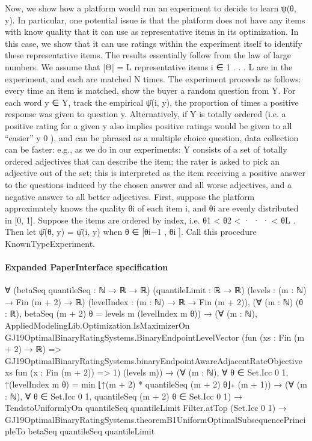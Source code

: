 \documentclass[10pt]{article}
\begin{document}
\begin{ReviewVerbatim}
Now, we show how a platform would run an experiment to decide to learn ψ(θ, y). In particular,
one potential issue is that the platform does not have any items with know quality that it can use
as representative items in its optimization. In this case, we show that it can use ratings within the
experiment itself to identify these representative items. The results essentially follow from the law
of large numbers.
We assume that |Θ| = L representative items i ∈ {1 . . . L} are in the experiment, and each are
matched N times. The experiment proceeds as follows: every time an item is matched, show the
buyer a random question from Y. For each word y ∈ Y, track the empirical ψ̂(i, y), the proportion
of times a positive response was given to question y. Alternatively, if Y is totally ordered (i.e. a
positive rating for a given y also implies positive ratings would be given to all “easier” y 0 ), and
can be phrased as a multiple choice question, data collection can be faster: e.g., as we do in our
experiments: Y consists of a set of totally ordered adjectives that can describe the item; the rater is
asked to pick an adjective out of the set; this is interpreted as the item receiving a positive answer
to the questions induced by the chosen answer and all worse adjectives, and a negative answer to
all better adjectives.
First, suppose the platform approximately knows the quality θi of each item i, and θi are evenly
distributed in [0, 1]. Suppose the items are ordered by index, i.e. θ1 < θ2 < · · · < θL . Then let
ψ̂(θ, y) = ψ̂(i, y) when θ ∈ [θi−1 , θi ]. Call this procedure KnownTypeExperiment.
\end{ReviewVerbatim}



\paragraph{Expanded PaperInterface specification}
\begin{ReviewVerbatim}
∀ (betaSeq quantileSeq : ℕ → ℝ → ℝ) (quantileLimit : ℝ → ℝ) (levels : (m : ℕ) → Fin (m + 2) → ℝ)
  (levelIndex : (m : ℕ) → ℝ → Fin (m + 2)),
  (∀ (m : ℕ) (θ : ℝ), betaSeq (m + 2) θ = levels m (levelIndex m θ)) →
    (∀ (m : ℕ),
        AppliedModelingLib.Optimization.IsMaximizerOn GJ19OptimalBinaryRatingSystems.BinaryEndpointLevelVector
          (fun (xs : Fin (m + 2) → ℝ) =>
            GJ19OptimalBinaryRatingSystems.binaryEndpointAwareAdjacentRateObjective xs fun (x : Fin (m + 2)) => 1)
          (levels m)) →
      (∀ (m : ℕ), ∀ θ ∈ Set.Icc 0 1, ↑(levelIndex m θ) = min ⌊↑(m + 2) * quantileSeq (m + 2) θ⌋₊ (m + 1)) →
        (∀ (m : ℕ), ∀ θ ∈ Set.Icc 0 1, quantileSeq (m + 2) θ ∈ Set.Icc 0 1) →
          TendstoUniformlyOn quantileSeq quantileLimit Filter.atTop (Set.Icc 0 1) →
            GJ19OptimalBinaryRatingSystems.theoremB1UniformOptimalSubsequencePrincipleTo betaSeq quantileSeq
              quantileLimit
\end{ReviewVerbatim}
\end{document}
